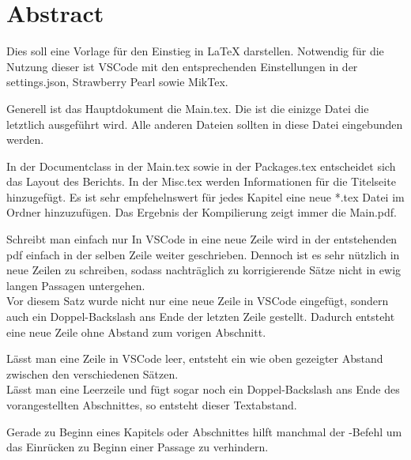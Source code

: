 \chapter*{Abstract}
Dies soll eine Vorlage für den Einstieg in LaTeX darstellen.
Notwendig für die Nutzung dieser ist VSCode mit den entsprechenden Einstellungen in der settings.json, Strawberry Pearl sowie MikTex.

Generell ist das Hauptdokument die Main.tex. Die ist die einizge Datei die letztlich ausgeführt wird. Alle anderen Dateien sollten in diese Datei eingebunden werden.

In der Documentclass in der Main.tex sowie in der Packages.tex entscheidet sich das Layout des Berichts. In der Misc.tex werden Informationen für die Titelseite hinzugefügt.
Es ist sehr empfehelnswert für jedes Kapitel eine neue *.tex Datei im Ordner  hinzuzufügen. Das Ergebnis der Kompilierung zeigt immer die Main.pdf.

Schreibt man einfach nur In VSCode in eine neue Zeile wird in der entstehenden pdf einfach in der selben Zeile weiter geschrieben.
Dennoch ist es sehr nützlich in neue Zeilen zu schreiben, sodass nachträglich zu korrigierende Sätze nicht in ewig langen Passagen untergehen. \\
Vor diesem Satz wurde nicht nur eine neue Zeile in VSCode eingefügt, sondern auch ein Doppel-Backslash \gans{\textbackslash\textbackslash} ans Ende der letzten Zeile gestellt. Dadurch entsteht eine neue Zeile ohne Abstand zum vorigen Abschnitt.

Lässt man eine Zeile in VSCode leer, entsteht ein wie oben gezeigter Abstand zwischen den verschiedenen Sätzen.\\

Lässt man eine Leerzeile und fügt sogar noch ein Doppel-Backslash \gans{\textbackslash\textbackslash} ans Ende des vorangestellten Abschnittes, so entsteht dieser Textabstand.

Gerade zu Beginn eines Kapitels oder Abschnittes hilft manchmal der -Befehl um das Einrücken zu Beginn einer Passage zu verhindern.
